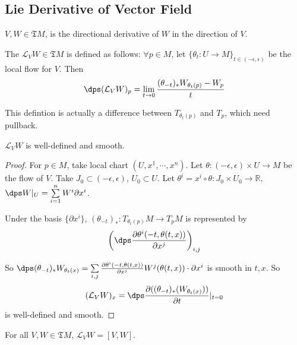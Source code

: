 \subsection{Lie Derivative of Vector Field}
 $ V,W\in \mathfrak{T}M $,   is the directional derivative of  $ W $ in the direction of  $ V $.
 \begin{definition}
    The   $ \mathcal{L}_VW\in \mathfrak{T}M $ is defined as follows: $ \forall p\in M $, let  $ \{\theta_t:U\rightarrow M\}_{t\in (-\epsilon,\epsilon)} $ be the local flow for  $ V $. Then  \[\dps (\mathcal{L}_VW)_p=\lim\limits_{t\to 0}\frac{(\theta_{-t})_*W_{\theta_t(p)}-W_p}{t} \]    
 \end{definition}
\begin{remark}
    This defintion is actually a difference between  $ T_{\theta_t(p)} $ and  $ T_p $, which need pullback.  
\end{remark}
 \begin{lemma}
     $ \mathcal{L}_VW $ is well-defined  and smooth.
 \end{lemma}    
\begin{proof}
    For  $ p\in M $, take local chart  $ (U,x^1,\cdots,x^n) $. Let  $ \theta :(-\epsilon,\epsilon)\times U\rightarrow M $ be the flow of  $ V $. Take  $ J_0\subset(-\epsilon,\epsilon) $,  $ U_0\subset U $. Let  $ \theta ^i=x^i\circ \theta:J_0\times U_0\rightarrow \mathbb{R} ,  $   $ \dps W|_U=\sum\limits_{i=1}^nW^i\partial x^i $.    
    
    Under the basis  $ \{\partial x^i\} $,  $ (\theta_{-t})_*:T_{\theta_t(p)}M\rightarrow T_pM $ is represented by 
    \[ \left(\dps\frac{\partial \theta^i(-t,\theta(t,x))}{\partial x^j}\right)_{i,j}\]
    
    So  $ \dps(\theta_{-t})_*W_{\theta_t(x)}=\sum\limits_{i,j}\frac{\partial \theta^i(-t,\theta(t,x))}{\partial x^j}W^j(\theta(t,x))\cdot \partial x^i $ is smooth in  $ t,x $.
    So 
    \[(\mathcal{L}_VW)_x=\dps\frac{\partial ((\theta_{-t})_*(W_{\theta_t(x)}))}{\partial t}|_{t=0}\] is well-defined and smooth.  
\end{proof}
 \begin{theorem}
    For all  $ V,W\in \mathfrak{T}M $,  $ \mathcal{L}_VW=[V,W] $.  
 \end{theorem}
